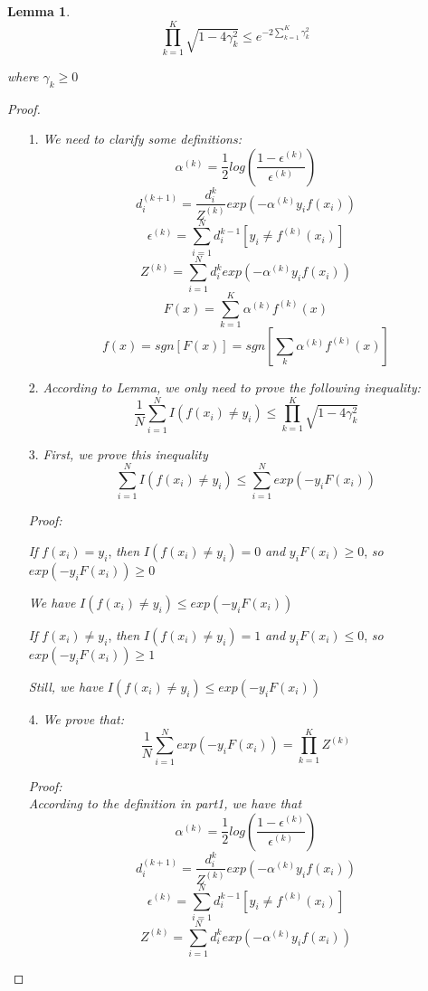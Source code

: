 \documentclass{article} %
\newtheorem{lemma}{Lemma}
\newtheorem{proof}{Proof}
\begin{document}
\begin{lemma}
$$\prod_{k=1}^K\sqrt{1-4\gamma_k^2}\leq e^{-2\sum_{k=1}^K\gamma_k^2}$$

where $\gamma_k\geq 0$
\end{lemma}
\begin{proof}
\begin{itemize}
\item[1.] \emph{We need to clarify some definitions:}
$$\alpha^{(k)}=\frac{1}{2}log(\frac{1-\epsilon^{(k)}}{\epsilon^{(k)}})$$
$$d_{i}^{(k+1)}=\frac{d_{i}^k}{Z^{(k)}}exp(-\alpha^{(k)}y_if(x_i))$$
$$\epsilon^{(k)}=\sum_{i=1}^Nd_i^{k-1}[y_i\neq f^{(k)}(x_i)]$$
$$Z^{(k)}=\sum_{i=1}^Nd_{i}^kexp(-\alpha^{(k)}y_if(x_i))$$
$$F(x)=\sum_{k=1}^K\alpha^{(k)}f^{(k)}(x)$$
$$f(x)=sgn[F(x)]=sgn[\sum_{k}\alpha^{(k)}f^{(k)}(x)]$$


\item[2.] \emph{According to Lemma, we only need to prove the following inequality:}
$$\frac{1}{N}\sum_{i=1}^NI(f(x_i)\neq y_i)\leq \prod_{k=1}^K\sqrt{1-4\gamma_k^2}$$

\item[3.] \emph{First, we prove this inequality}
$$\sum_{i=1}^NI(f(x_i)\neq y_i)\leq \sum_{i=1}^Nexp(-y_iF(x_i))$$

\emph{Proof:}

\emph{If} $f(x_i)=y_i$, \emph{then} $I(f(x_i)\neq y_i)=0$ \emph{and} $y_iF(x_i)\geq 0$, \emph{so} $exp(-y_iF(x_i))\geq 0$

\emph{We have} $I(f(x_i)\neq y_i)\leq exp(-y_iF(x_i))$

\emph{If} $f(x_i)\neq y_i$, \emph{then} $I(f(x_i)\neq y_i)=1$ \emph{and} $y_iF(x_i)\leq 0$, \emph{so} $exp(-y_iF(x_i))\geq 1$

\emph{Still, we have} $I(f(x_i)\neq y_i)\leq exp(-y_iF(x_i))$

\item[4.] \emph{We prove that:}
$$\frac{1}{N}\sum_{i=1}^Nexp(-y_iF(x_i))=\prod_{k=1}^KZ^{(k)}$$

\emph{Proof:\\According to the definition in part1, we have that}
$$\alpha^{(k)}=\frac{1}{2}log(\frac{1-\epsilon^{(k)}}{\epsilon^{(k)}})$$
$$d_{i}^{(k+1)}=\frac{d_{i}^k}{Z^{(k)}}exp(-\alpha^{(k)}y_if(x_i))$$
$$\epsilon^{(k)}=\sum_{i=1}^Nd_i^{k-1}[y_i\neq f^{(k)}(x_i)]$$
$$Z^{(k)}=\sum_{i=1}^Nd_{i}^kexp(-\alpha^{(k)}y_if(x_i))$$


\end{itemize}
\end{proof}
\end{document}
